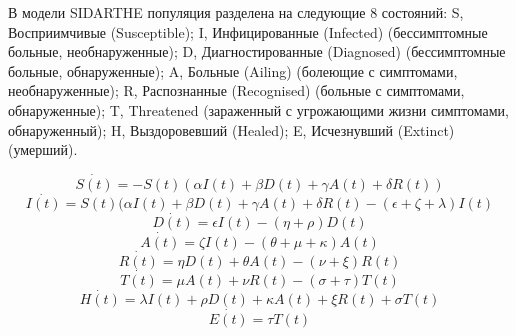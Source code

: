 В модели SIDARTHE популяция разделена на следующие 8 состояний: \newline
 S, Восприимчивые (Susceptible); \newline
 I, Инфицированные (Infected) (бессимптомные больные, необнаруженные); \newline
 D, Диагностированные (Diagnosed) (бессимптомные больные, обнаруженные);  \newline
 A, Больные (Ailing) (болеющие с симптомами, необнаруженные);  \newline
 R, Распознанные (Recognised) (больные с симптомами, обнаруженные); \newline
 T, Threatened (зараженный с угрожающими жизни симптомами, обнаруженный);  \newline
 H,  Выздоровевший (Healed); \newline
 E, Исчезнувший (Extinct) (умерший). \newline

\begin{equation*}
    \dot{S(t)} = -S(t)(\alpha I(t)+\beta D(t) +\gamma A(t) + \delta R(t))
  \end{equation*}
  \begin{equation*}
   \dot{I(t)} = S(t)(\alpha I(t) + \beta D(t) +\gamma A(t) +\delta R(t) -(\epsilon+\zeta+\lambda)I(t)
\end{equation*}
\begin{equation*}
    \dot{D(t)} = \epsilon I(t) - (\eta +\rho)D(t)
\end{equation*}
\begin{equation*}
    \dot{A(t)} = \zeta I(t) - (\theta+\mu+\kappa)A(t)
  \end{equation*}
  \begin{equation*}
    \dot{R(t)} = \eta D(t) + \theta A(t) - (\nu+\xi) R(t)
    \end{equation*}
    \begin{equation*}
    \dot{T(t)} =\mu A(t) + \nu R(t) - (\sigma+\tau) T(t)
    \end{equation*}
  \begin{equation*}
    \dot{H(t)} =\lambda I(t) +\rho D(t) +\kappa A(t) +\xi R(t)  +\sigma T(t)
    \end{equation*}
 \begin{equation*}
    \dot{E(t)} = \tau T(t)
\end{equation*}

